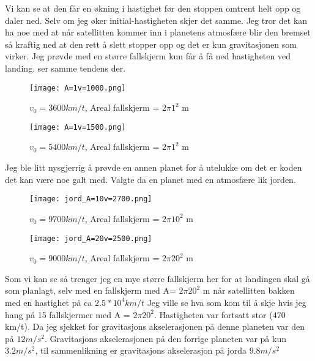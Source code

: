 \documentclass[12pt,preprint]{aastex6}
\begin{document}
Vi kan se at den får en økning i hastighet før den stoppen omtrent helt opp og daler ned. Selv om jeg øker initial-hastigheten skjer det samme. Jeg tror det kan ha noe med at når satellitten kommer inn i planetens atmosfære blir den bremset så kraftig ned at den rett å slett stopper opp og det er kun gravitasjonen som virker. Jeg prøvde med en større fallskjerm kun får å få ned hastigheten ved landing. ser samme tendens der.

\begin{figure}[ht]
\begin{minipage}[b]{0.45\linewidth}
\centering
\texttt{[image: A=1v=1000.png]}
\caption{$v_0 = 3600 km/t$, Areal fallskjerm = $2\pi1^2$ m}
\label{fig:figure1}
\end{minipage}
\hspace{0.5cm}
\begin{minipage}[b]{0.45\linewidth}
\centering
\texttt{[image: A=1v=1500.png]}
\caption{$v_0 = 5400 km/t$, Areal fallskjerm = $2\pi1^2$ m}
\label{fig:figure2}
\end{minipage}
\end{figure}

Jeg ble litt nysgjerrig å prøvde en annen planet for å utelukke om det er koden det kan være noe galt med. Valgte da en planet med en atmosfære lik jorden.

\begin{figure}[ht]
\begin{minipage}[b]{0.45\linewidth}
\centering
\texttt{[image: jord\_A=10v=2700.png]}
\caption{$v_0 = 9700 km/t$, Areal fallskjerm = $2\pi10^2$ m}
\label{fig:figure1}
\end{minipage}
\hspace{0.5cm}
\begin{minipage}[b]{0.45\linewidth}
\centering
\texttt{[image: jord\_A=20v=2500.png]}
\caption{$v_0 = 9000 km/t$, Areal fallskjerm = $2\pi20^2$ m}
\label{fig:figure2}
\end{minipage}
\end{figure}

Som vi kan se så trenger jeg en mye større fallskjerm her for at landingen skal gå som planlagt, selv med en fallskjerm med A=  $2\pi20^2$ m når satellitten bakken med en hastighet på ca $2.5*10^4 km/t$ Jeg ville se hva som  kom til å skje hvis jeg hang på 15 fallskjermer med A = $2\pi20^2$. Hastigheten var fortsatt stor (470 km/t). Da jeg sjekket for gravitasjons akselerasjonen på denne planeten var den på $12 m/s^2$. Gravitasjons akselerasjonen på den forrige planeten var på kun $3.2m/s^2$, til sammenlikning er gravitasjons akselerasjon på jorda $9.8 m/s^2$
\end{document}
